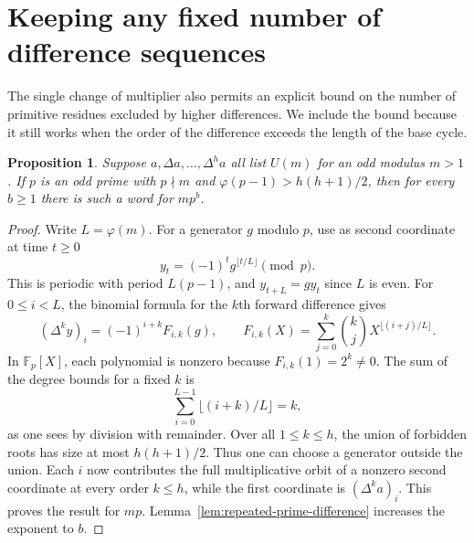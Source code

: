 \documentclass[11pt,a4paper]{article}
\newtheorem{proposition}[theorem]{Proposition}
\newcommand{\U}{U}
\newcommand{\F}{\mathbb F}
\begin{document}
\section{Keeping any fixed number of difference sequences}
The single change of multiplier also permits an explicit bound on the number of primitive residues excluded by higher differences. We include the bound because it still works when the order of the difference exceeds the length of the base cycle.
\begin{proposition}\label{thm:high}
Suppose $a,\Delta a,\ldots,\Delta^h a$ all list $\U(m)$ for an odd modulus $m>1$. If $p$ is an odd prime with $p\nmid m$ and $\varphi(p-1)>h(h+1)/2$, then for every $b\ge1$ there is such a word for $mp^b$.
\end{proposition}
\begin{proof}
Write $L=\varphi(m)$. For a generator $g$ modulo $p$, use as second coordinate at time $t\ge0$
\[
                    y_t=(-1)^t g^{\lfloor t/L\rfloor}\pmod p .
\]
This is periodic with period $L(p-1)$, and $y_{t+L}=g y_t$ since $L$ is even. For $0\le i<L$, the binomial formula for the $k$th forward difference gives
\[
 (\Delta^k y)_i=(-1)^{i+k}F_{i,k}(g),\qquad
 F_{i,k}(X)=\sum_{j=0}^k\binom{k}{j}X^{\lfloor(i+j)/L\rfloor}.
\]
In $\F_p[X]$, each polynomial is nonzero because $F_{i,k}(1)=2^k\ne0$. The sum of the degree bounds for a fixed $k$ is
\[
           \sum_{i=0}^{L-1}\lfloor(i+k)/L\rfloor=k,
\]
as one sees by division with remainder. Over all $1\le k\le h$, the union of forbidden roots has size at most $h(h+1)/2$. Thus one can choose a generator outside the union. Each $i$ now contributes the full multiplicative orbit of a nonzero second coordinate at every order $k\le h$, while the first coordinate is $(\Delta^k a)_i$. This proves the result for $mp$. Lemma~\ref{lem:repeated-prime-difference} increases the exponent to $b$.
\end{proof}
\end{document}
